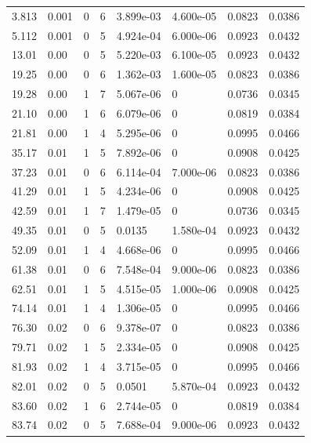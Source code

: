 \documentclass[preview]{standalone}
\begin{document}
{{\begin{tabular}{L{1.2cm}C{1.2cm} C{0.3cm}C{0.5cm} C{1.4cm}C{1.4cm} C{1.4cm}C{1.4cm}}
  3.813  &  0.001  & 0     &  6 &  3.899e-03  & 4.600e-05  & 0.0823 &  0.0386   \\ 
  5.112  &  0.001  & 0     &  5 &  4.924e-04  & 6.000e-06  & 0.0923 &  0.0432   \\ 
  13.01  &  0.00  & 0     &  5 &  5.220e-03  & 6.100e-05  & 0.0923 &  0.0432   \\ 
  19.25  &  0.00  & 0     &  6 &  1.362e-03  & 1.600e-05  & 0.0823 &  0.0386   \\ 
  19.28  &  0.00  & 1     &  7 &  5.067e-06  & 0  & 0.0736 &  0.0345   \\ 
  21.10  &  0.00  & 1     &  6 &  6.079e-06  & 0  & 0.0819 &  0.0384   \\ 
  21.81  &  0.00  & 1     &  4 &  5.295e-06  & 0  & 0.0995 &  0.0466   \\ 
  35.17  &  0.01  & 1     &  5 &  7.892e-06  & 0  & 0.0908 &  0.0425   \\ 
  37.23  &  0.01  & 0     &  6 &  6.114e-04  & 7.000e-06  & 0.0823 &  0.0386   \\ 
  41.29  &  0.01  & 1     &  5 &  4.234e-06  & 0  & 0.0908 &  0.0425   \\ 
  42.59  &  0.01  & 1     &  7 &  1.479e-05  & 0  & 0.0736 &  0.0345   \\ 
  49.35  &  0.01  & 0     &  5 &  0.0135  & 1.580e-04  & 0.0923 &  0.0432   \\ 
  52.09  &  0.01  & 1     &  4 &  4.668e-06  & 0  & 0.0995 &  0.0466   \\ 
  61.38  &  0.01  & 0     &  6 &  7.548e-04  & 9.000e-06  & 0.0823 &  0.0386   \\ 
  62.51  &  0.01  & 1     &  5 &  4.515e-05  & 1.000e-06  & 0.0908 &  0.0425   \\ 
  74.14  &  0.01  & 1     &  4 &  1.306e-05  & 0  & 0.0995 &  0.0466   \\ 
  76.30  &  0.02  & 0     &  6 &  9.378e-07  & 0  & 0.0823 &  0.0386   \\ 
  79.71  &  0.02  & 1     &  5 &  2.334e-05  & 0  & 0.0908 &  0.0425   \\ 
  81.93  &  0.02  & 1     &  4 &  3.715e-05  & 0  & 0.0995 &  0.0466   \\ 
  82.01  &  0.02  & 0     &  5 &  0.0501  & 5.870e-04  & 0.0923 &  0.0432   \\ 
  83.60  &  0.02  & 1     &  6 &  2.744e-05  & 0  & 0.0819 &  0.0384   \\ 
  83.74  &  0.02  & 0     &  5 &  7.688e-04  & 9.000e-06  & 0.0923 &  0.0432   \\ 

\end{tabular}}}
\end{document}
